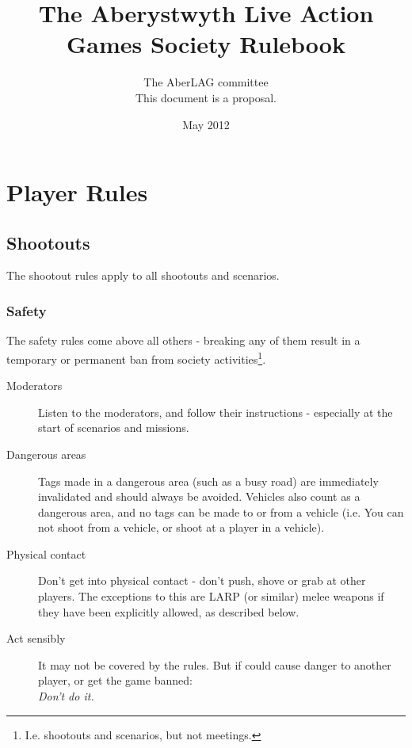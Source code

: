 \documentclass{report}
\begin{document}
\title{The Aberystwyth Live Action Games Society Rulebook}
\author{The AberLAG committee \\ This document is a proposal.}
\date{May 2012}
\maketitle{}

\tableofcontents
\newpage

\chapter{Player Rules}

\section{Shootouts}

The shootout rules apply to all shootouts and scenarios.

	\subsection{Safety}
	
	The safety rules come above all others - breaking any of them result in a temporary or permanent ban from society activities\footnote{I.e. shootouts and scenarios, but not meetings.}.

	\begin{description}
		\item[Moderators] Listen to the moderators, and follow their instructions - especially at the start of scenarios and missions.
		\item[Dangerous areas] Tags made in a dangerous area (such as a busy road) are immediately invalidated and should always be avoided. Vehicles also count as a dangerous area, and no tags can be made to or from a vehicle (i.e. You can not shoot from a vehicle, or shoot at a player in a vehicle).
		\item[Physical contact] Don't get into physical contact - don't push, shove or grab at other players. The exceptions to this are LARP (or similar) melee weapons if they have been explicitly allowed, as described below.
		\item[Act sensibly] It may not be covered by the rules. But if could cause danger to another player, or get the game banned: \\ \textit{Don't do it.}
	\end{description}
	
\end{document}
